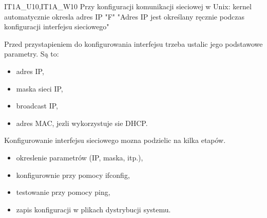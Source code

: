\answer
{IT1A\_U10,IT1A\_W10 Przy konfiguracji komunikacji sieciowej w Unix:}
{kernel automatycznie okresla adres IP }
{"F"}
{"Adres IP jest określany ręcznie podczas konfiguracji interfejsu sieciowego"}
{Przed przystapieniem do konfigurowania interfejsu trzeba ustalic jego podstawowe
parametry. Są to:
\begin{itemize}
\item adres IP,
\item maska sieci IP,
\item broadcast IP,
\item adres MAC, jezli wykorzystuje sie DHCP.
\end{itemize}
Konfigurowanie interfejsu sieciowego mozna podzielic na kilka etapów.
\begin{itemize}
\item okreslenie parametrów (IP, maska, itp.),
\item konfigurownie przy pomocy ifconfig,
\item testowanie przy pomocy ping,
\item zapis konfiguracji w plikach dystrybucji systemu.
\end{itemize}
}


